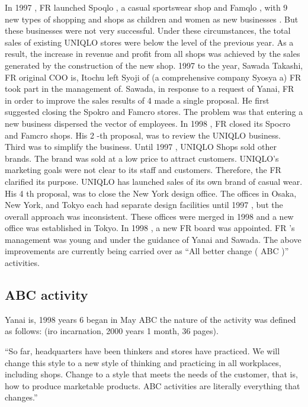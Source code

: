 \documentclass[12pt,]{article}
\begin{document}
In 1997 , FR launched Spoqlo , a casual sportswear shop and Famqlo ,
with 9 new types of shopping and shops as children and women as new
businesses . But these businesses were not very successful. Under these
circumstances, the total sales of existing UNIQLO stores were below the
level of the previous year. As a result, the increase in revenue and
profit from all shops was achieved by the sales generated by the
construction of the new shop. 1997 to the year, Sawada Takashi, FR
original COO is, Itochu left Syoji of (a comprehensive company Syosya a)
FR took part in the management of. Sawada, in response to a request of
Yanai, FR in order to improve the sales results of 4 made a single
proposal. He first suggested closing the Spokro and Famcro stores. The
problem was that entering a new business dispersed the vector of
employees. In 1998 , FR closed its Spocro and Famcro shops. His 2 -th
proposal, was to review the UNIQLO business. Third was to simplify the
business. Until 1997 , UNIQLO Shops sold other brands. The brand was
sold at a low price to attract customers. UNIQLO's marketing goals were
not clear to its staff and customers. Therefore, the FR clarified its
purpose. UNIQLO has launched sales of its own brand of casual wear. His
4 th proposal, was to close the New York design office. The offices in
Osaka, New York, and Tokyo each had separate design facilities until
1997 , but the overall approach was inconsistent. These offices were
merged in 1998 and a new office was established in Tokyo. In 1998 , a
new FR board was appointed. FR 's management was young and under the
guidance of Yanai and Sawada. The above improvements are currently being
carried over as ``All better change ( ABC )'' activities.

\hypertarget{abc-activity}{%
\subsection{ABC activity}\label{abc-activity}}

Yanai is, 1998 years 6 began in May ABC the nature of the activity was
defined as follows: (iro incarnation, 2000 years 1 month, 36 pages).

``So far, headquarters have been thinkers and stores have practiced. We
will change this style to a new style of thinking and practicing in all
workplaces, including shops. Change to a style that meets the needs of
the customer, that is, how to produce marketable products. ABC
activities are literally everything that changes.''
\end{document}
